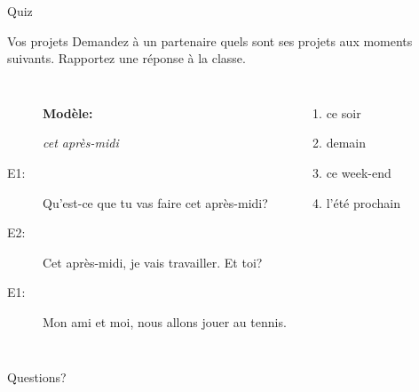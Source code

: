 \documentclass{beamer}
\begin{document}
  \begin{frame}{}
    \begin{center}
      \Large Quiz
    \end{center}
  \end{frame}

  \begin{frame}{Vos projets}
    Demandez à un partenaire quels sont ses projets aux moments suivants.
    Rapportez une réponse à la classe. \\
    \begin{columns}
        \begin{description}
          \item[] \textbf{Modèle:}
          \item[] \emph{cet après-midi}
          \item[E1:] Qu'est-ce que tu vas faire cet après-midi?
          \item[E2:] Cet après-midi, je vais travailler. Et toi?
          \item[E1:] Mon ami et moi, nous allons jouer au tennis.
        \end{description}
        \begin{enumerate}
          \item ce soir
          \item demain
          \item ce week-end
          \item l'été prochain
        \end{enumerate}
    \end{columns}
  \end{frame}

  \begin{frame}{}
    \begin{center}
      \Large Questions?
    \end{center}
  \end{frame}
\end{document}
